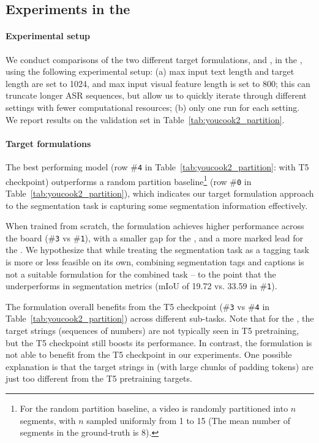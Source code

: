 \documentclass[11pt]{article}
\begin{document}
\subsection{Experiments in the \partitionsetting}
\paragraph{Experimental setup}
We conduct comparisons of the two different target formulations, \hardencoding and \offsetbased, in the \partitionsetting, using the following experimental setup: (a) max input text length and target length are set to 1024, and max input visual feature length is set to 800; this can truncate longer ASR sequences, but allow us to quickly iterate through different settings with fewer computational resources; 
(b) only one run for each setting.
We report results on the validation set in Table~\ref{tab:youcook2_partition}.

\paragraph{Target formulations}
The best performing model (row \#\texttt{4} in Table~\ref{tab:youcook2_partition}: \offsetbased with T5 checkpoint) outperforms a random partition baseline\footnote{For the random partition baseline, a video is randomly partitioned into $n$ segments, with $n$ sampled uniformly from 1 to 15 (The mean number of segments in the ground-truth is 8).} (row \#\texttt{0} in Table~\ref{tab:youcook2_partition}), 
which indicates our target formulation approach to the segmentation task is capturing some segmentation information effectively. 

When trained from scratch, the \offsetbased formulation achieves higher performance across the board (\#\texttt{3} vs \#\texttt{1}), with a smaller gap for the \segonly, and a more marked lead for the \segcap.
We hypothesize that while treating the segmentation task as a tagging task is more or less feasible on its own, combining segmentation tags and captions is not a suitable formulation for the combined task -- to the point that the \segcap underperforms \segonly in segmentation metrics (mIoU of 19.72 vs. 33.59 in \#\texttt{1}).

The \offsetbased formulation overall benefits from the T5 checkpoint (\#\texttt{3} vs \#\texttt{4} in Table~\ref{tab:youcook2_partition}) across different sub-tasks.  Note that for the \segonly, the target strings (sequences of numbers) are not typically seen in T5 pretraining, but the T5 checkpoint still boosts its performance.
In contrast, the \hardencoding formulation is not able to benefit from the T5 checkpoint in our experiments. One possible explanation is that the target strings in \hardencoding (with large chunks of padding tokens) are just too different from the T5 pretraining targets.  
\end{document}

